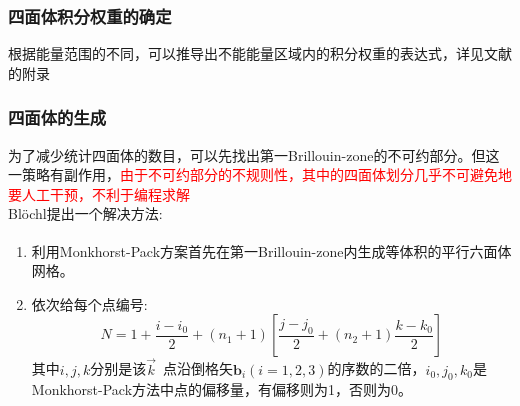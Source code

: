\documentclass[cjk,slidestop,compress,mathserif,blue]{beamer}
\newcommand{\upcite}[1]{\hspace{0ex}\textsuperscript{\cite{#1}}} %
\begin{document}
\frame
{
	\frametitle{四面体积分权重的确定}
\begin{figure}[h!]
\centering
{}
	\hfill
{}
\end{figure}
根据能量范围的不同，可以推导出不能能量区域内的积分权重的表达式，详见文献\cite{PRB49-16233_1994}的附录
}

\frame
{
	\frametitle{四面体的生成}
	为了减少统计四面体的数目，可以先找出第一\textrm{Brillouin-zone}的不可约部分。但这一策略有副作用，\textcolor{red}{由于不可约部分的不规则性，其中的四面体划分几乎不可避免地要人工干预，不利于编程求解}\\\textrm{Bl\"ochl}提出一个解决方法:\\
\begin{enumerate}
	\item 利用\textrm{Monkhorst-Pack}方案\upcite{PRB13-5188_1976}首先在第一\textrm{Brillouin-zone}内生成等体积的平行六面体网格。
	\item 依次给每个点编号:
\begin{displaymath}
	\boxed{N=1+\dfrac{i-i_0}2+(n_1+1)\left[\dfrac{j-j_0}2+(n_2+1)\dfrac{k-k_0}2\right]}
\end{displaymath}
其中$i,j,k$分别是该$\vec k$~点沿倒格矢$\mathbf{b}_i(i=1,2,3)$的序数的二倍，$i_0,j_0,k_0$是\textrm{Monkhorst-Pack}方法中点的偏移量，有偏移则为1，否则为0。
\end{enumerate}
}
\end{document}
